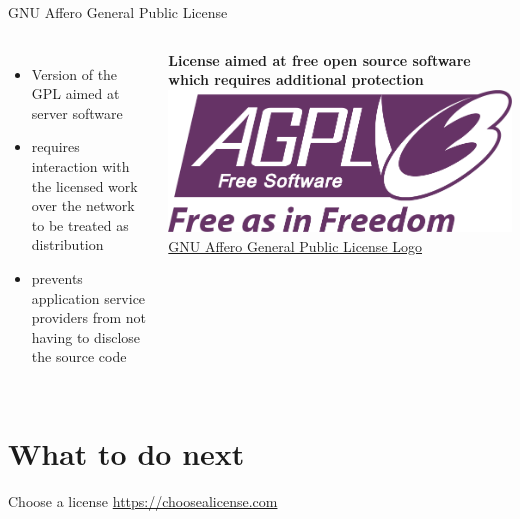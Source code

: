 \documentclass[10pt, graphics, aspectratio=169, table]{beamer}
\begin{document}
    \begin{frame}{GNU Affero General Public License}
        \begin{columns}
                \begin{itemize}
                    \item Version of the GPL aimed at server software
                    \item requires interaction with the licensed work over the network to be treated as distribution
                    \item prevents application service providers from not having to disclose the source code
                \end{itemize}
                \textbf{License aimed at free open source software which requires additional protection}
                \includegraphics[width=\textwidth]{img/AGPL.png}
                \center\tiny\href{https://commons.wikimedia.org/wiki/File:AGPLv3_Logo.svg}{GNU Affero General Public License Logo}
        \end{columns}
    \end{frame}


    \section{What to do next}
    \begin{frame}{Choose a license}
        \center{}
        \center\url{https://choosealicense.com}
    \end{frame}
    
\end{document}
